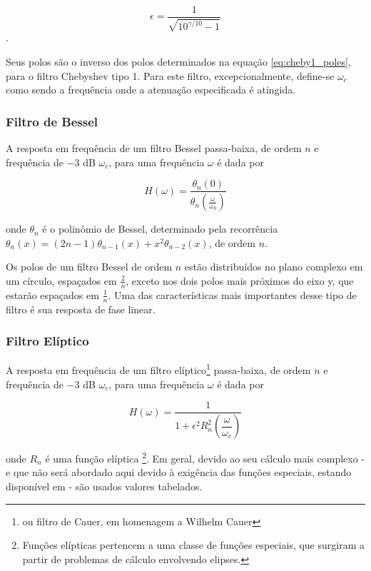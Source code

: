 \begin{equation}
\epsilon = \frac{1}{\sqrt{10^{\gamma/10} - 1}}
\end{equation}.

Seus polos são o inverso dos polos determinados na equação \ref{eq:cheby1_poles}, para o filtro Chebyshev tipo 1. Para este filtro, excepcionalmente, define-se $\omega_c$ como sendo a frequência onde a atenuação especificada é atingida.

\subsubsection{Filtro de Bessel}
A resposta em frequência de um filtro Bessel passa-baixa, de ordem $n$ e frequência de $-3$ dB $\omega_c$, para uma frequência $\omega$ é dada por 

\begin{equation}
H(\omega) = \frac{\theta_n(0)}{\theta_n(\frac{\omega}{\omega_0})}
\label{eq:bessel_tf}
\end{equation}

onde $\theta_n$ é o polinômio de Bessel, determinado pela recorrência $\theta_n(x) = (2n-1)\theta_{n-1}(x) + x^2 \theta_{n-2}(x)$, de ordem $n$.

Os polos de um filtro Bessel de ordem $n$ estão distribuídos no plano complexo em um círculo, espaçados em $\frac{2}{n}$, exceto nos dois polos mais próximos do eixo y, que estarão espaçados em $\frac{1}{n}$. Uma das características mais importantes desse tipo de filtro é sua resposta de fase linear. 

\subsubsection{Filtro Elíptico}
A resposta em frequência de um filtro elíptico\footnote{ou filtro de Cauer, em homenagem a Wilhelm Cauer} passa-baixa, de ordem $n$ e frequência de $-3$ dB $\omega_c$, para uma frequência $\omega$ é dada por

\begin{equation}
H(\omega) = \frac{1}{1 + \epsilon^2 R^2_n (\dfrac{\omega}{\omega_c})}
\label{eq:ell_tf}
\end{equation}

onde $R_n$ é uma função elíptica \footnote{Funções elípticas pertencem a uma classe de funções especiais, que surgiram a partir de problemas de cálculo envolvendo elipses.}. Em geral, devido ao seu cálculo mais complexo - e que não será abordado aqui devido à exigência das funções especiais, estando disponível em \cite{paarmann} - são usados valores tabelados.

